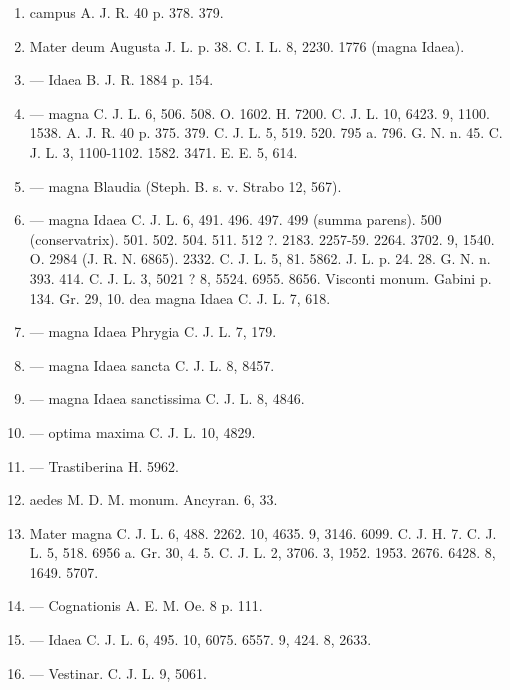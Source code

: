 \documentclass[a4paper, 11pt, oneside, polutonikogreek, german]{article}
\begin{document}
\begin{enumerate}
\item campus A. J. R. 40 p. 378. 379.

\item Mater deum Augusta J. L. p. 38. C. I. L. 8, 2230. 1776 (magna Idaea).

\item --- Idaea B. J. R. 1884 p. 154.

\item --- magna C. J. L. 6, 506. 508. O. 1602. H. 7200. C. J. L. 10, 6423. 9, 1100. 1538. A. J. R. 40 p. 375. 379. C. J. L. 5, 519. 520. 795 a. 796. G. N. n. 45. C. J. L. 3, 1100-1102. 1582. 3471. E. E. 5, 614.

\item --- magna Blaudia (Steph. B. s. v. Strabo 12, 567).

\item --- magna Idaea C. J. L. 6, 491. 496. 497. 499 (summa parens). 500 (conservatrix). 501. 502. 504. 511. 512 ?. 2183. 2257-59. 2264. 3702. 9, 1540. O. 2984 (J. R. N. 6865). 2332. C. J. L. 5, 81. 5862. J. L. p. 24. 28. G. N. n. 393. 414. C. J. L. 3, 5021 ? 8, 5524. 6955. 8656. Visconti monum. Gabini p. 134. Gr. 29, 10. dea magna Idaea C. J. L. 7, 618.

\item --- magna Idaea Phrygia C. J. L. 7, 179.

\item --- magna Idaea sancta C. J. L. 8, 8457.

\item --- magna Idaea sanctissima C. J. L. 8, 4846.

\item --- optima maxima C. J. L. 10, 4829.

\item --- Trastiberina H. 5962.

\item aedes M. D. M. monum. Ancyran. 6, 33.

\item Mater magna C. J. L. 6, 488. 2262. 10, 4635. 9, 3146. 6099. C. J. H. 7. C. J. L. 5, 518. 6956 a. Gr. 30, 4. 5. C. J. L. 2, 3706. 3, 1952. 1953. 2676. 6428. 8, 1649. 5707.

\item --- Cognationis A. E. M. Oe. 8 p. 111.

\item --- Idaea C. J. L. 6, 495. 10, 6075. 6557. 9, 424. 8, 2633.

\item --- Vestinar. C. J. L. 9, 5061.


\end{enumerate}
\end{document}
